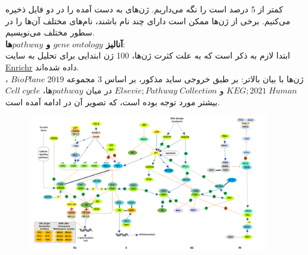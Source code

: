 \documentclass[a4paper,12pt]{article}
\begin{document}
کمتر از 5 درصد است را نگه‌ می‌داریم. ژن‌های به دست آمده را در دو فایل ذخیره می‌کنیم. برخی از ژن‌ها ممکن است دارای چند نام باشند، نام‌های مختلف آن‌ها را در سطور مختلف می‌نویسیم.\\
\textbf{آنالیز $gene\; ontology$ و $pathway$ها}: \\
ابتدا لازم به ذکر است که به علت کثرت ژن‌ها، 100 ژن ابتدایی برای تحلیل به سایت
\href{https://maayanlab.cloud}{Enrichr}
داده شده‌اند.\\
ژن‌ها با بیان بالاتر: بر طبق خروجی ساید مذکور، بر اساس 3 مجموعه
$BioPlane\; 2019$
،
$KEG; 2021\; Human$
و
$Elsevie; Pathway\; Collection$
در میان $pathway$ها،
$Cell\; cycle$
بیشتر مورد توجه بوده است، که تصویر آن در ادامه آمده است.
\begin{figure}[H]
 \centering
  \includegraphics[width=0.8\linewidth , height=6cm]{../../source/Cell-cycle-picture.png}
\end{figure}
\end{document}
